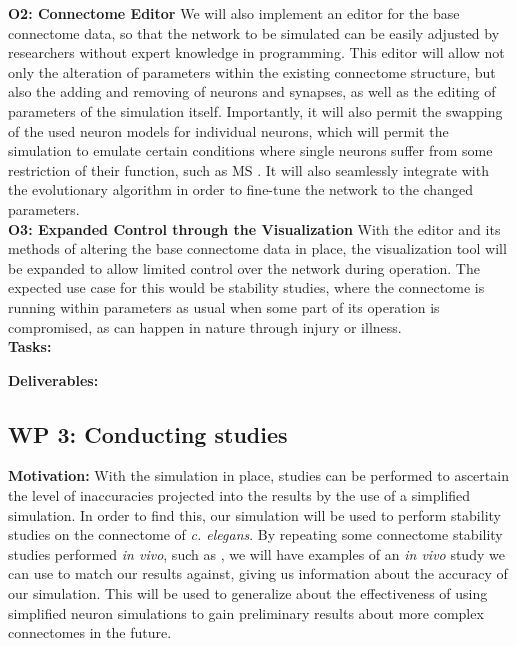 \documentclass[a4paper,11pt]{article}
\begin{document}
\textbf{O2: Connectome Editor} 
We will also implement an editor for the base connectome data, so that the network to be simulated can be easily adjusted by researchers without expert knowledge in programming. This editor will allow not only the alteration of parameters within the existing connectome structure, but also the adding and removing of neurons and synapses, as well as the editing of parameters of the simulation itself. Importantly, it will also permit the swapping of the used neuron models for individual neurons, which will permit the simulation to emulate certain conditions where single neurons suffer from some restriction of their function, such as MS \citep{Hauser2006}. It will also seamlessly integrate with the evolutionary algorithm in order to fine-tune the network to the changed parameters.
\\[0,2cm]

\textbf{O3: Expanded Control through the Visualization}
With the editor and its methods of altering the base connectome data in place, the visualization tool will be expanded to allow limited control over the network during operation. The expected use case for this would be stability studies, where the connectome is running within parameters as usual when some part of its operation is compromised, as can happen in nature through injury or illness.
\\[0,2cm]

\textbf{Tasks:} 

\textbf{Deliverables:} 

\subsection{WP 3: Conducting studies}

\textbf{Motivation:}
With the simulation in place, studies can be performed to ascertain the level of inaccuracies projected into the results by the use of a simplified simulation. In order to find this, our simulation will be used to perform stability studies on the connectome of \emph{c. elegans}. By repeating some connectome stability studies performed \emph{in vivo}, such as \citep{Avery1989473}, we will have examples of an \emph{in vivo} study we can use to match our results against, giving us information about the accuracy of our simulation. This will be used to generalize about the effectiveness of using simplified neuron simulations to gain preliminary results about more complex connectomes in the future. 
\end{document}
